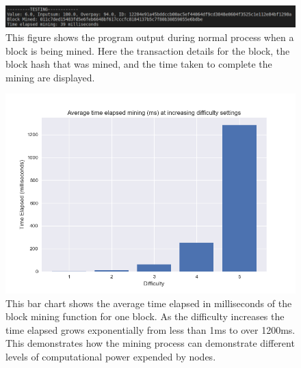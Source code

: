 \documentclass{l4proj}
\begin{document}
\begin{figure}[!ht]
    \centering
    \includegraphics[width=1\linewidth]{images/check2.png}    
    \caption
    {
        This figure shows the program output during normal process when a block is being mined. Here the transaction
        details for the block, the block hash that was mined, and the time taken to complete the mining are displayed.
    }
    \label{fig:check2} 
\end{figure}

\begin{figure}[!ht]
    \centering
    \includegraphics[width=1\linewidth]{images/avgBar.png}    
    \caption
    {
        This bar chart shows the average time elapsed in milliseconds of the block mining function for one block.
        As the difficulty increases the time elapsed grows exponentially from less than 1ms to over 1200ms. This
        demonstrates how the mining process can demonstrate different levels of computational power expended by
        nodes.
    }
    \label{fig:avgBar} 
\end{figure}
\end{document}

